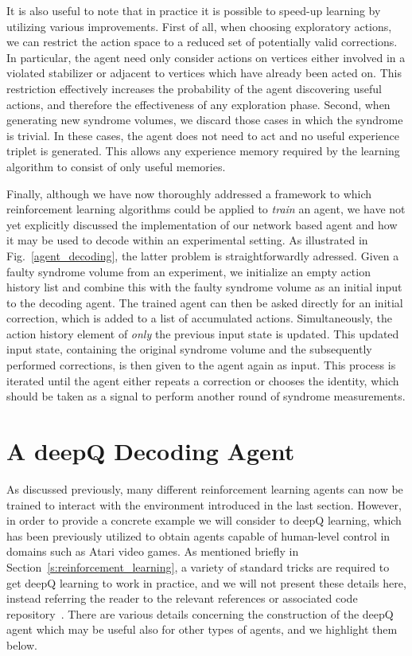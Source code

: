 \documentclass[twocolumn,preprintnumbers,amsmath,amssymb,notitlepage,nofootinbib,longbibliography,superscriptaddress,aps,pra,10pt]{revtex4-1}
\begin{document}
	It is also useful to note that in practice it is possible to speed-up learning by utilizing various improvements.
	First of all, when choosing exploratory actions, we can restrict the action space to a reduced set of potentially valid corrections.
	In particular, the agent need only consider actions on vertices either involved in a violated stabilizer or adjacent to vertices which have already been acted on.
	This restriction effectively increases the probability of the agent discovering useful actions, and therefore the effectiveness of any exploration phase.
	Second, when generating new syndrome volumes, we discard those cases in which the syndrome is trivial. In these cases, the agent does not need to act and no useful
	experience triplet is generated. This allows any experience memory required by the learning algorithm to consist of only useful memories.

	Finally, although we have now thoroughly addressed a framework to which reinforcement learning algorithms could be applied to \textit{train} an agent, we have not yet explicitly discussed
	the implementation of our network based agent and how it may be used to decode within an experimental setting.
	As illustrated in Fig.~\ref{agent_decoding}, the latter problem is straightforwardly adressed.
	Given a faulty syndrome volume from an experiment, we initialize an empty action history list and combine this with the faulty syndrome volume as an initial input to the decoding agent.
	The trained agent can then be asked directly for an initial correction, which is added to a list of accumulated actions. Simultaneously, the action history element of \textit{only} the
	previous input state is updated. This updated input state, containing the original syndrome volume and the subsequently performed corrections,
	is then given to the agent again as input. This process is iterated until the agent either repeats a correction or chooses the identity, which should be taken as a signal to perform
	another round of syndrome measurements.

\section{A deepQ Decoding Agent}\label{s:dq_agent}

	As discussed previously, many different reinforcement learning agents can now be trained to interact with the environment introduced in the last section.
	However, in order to provide a concrete example we will consider to deepQ learning, which has been previously utilized to obtain agents capable of human-level control in domains such as Atari video games.
	As mentioned briefly in Section~\ref{s:reinforcement_learning}, a variety of standard tricks are required to get deepQ learning to work in practice, and we will not present these details here,
	instead referring the reader to the relevant references or associated code repository~\cite{}.
	There are various details concerning the construction of the deepQ agent which may be useful also for other types of agents, and we highlight them below.
\end{document}
